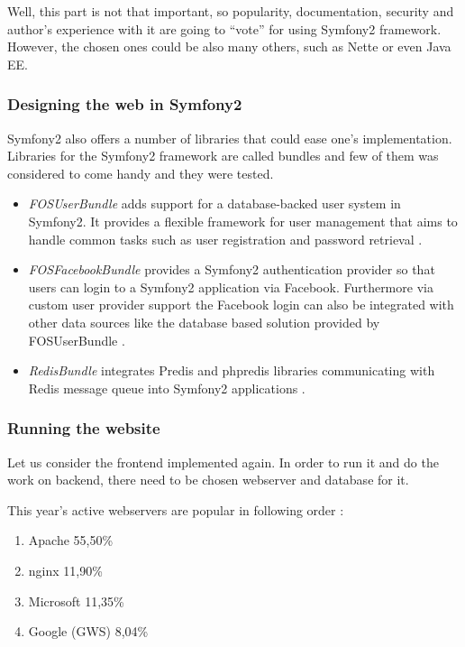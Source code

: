 \documentclass[thesis=B,english]{FITthesis}[2013/04/26]
\begin{document}
Well, this part is not that important, so popularity, documentation, security and author's experience with it are going to ``vote'' for using Symfony2 framework. However, the chosen ones could be also many others, such as Nette or even Java EE.

\subsubsection{Designing the web in Symfony2}

Symfony2 also offers a number of libraries that could ease one's implementation. Libraries for the Symfony2 framework are called bundles and few of them was considered to come handy and they were tested.

\begin{itemize}
	\item \emph{FOSUserBundle} adds support for a database-backed user system in Symfony2. It provides a flexible framework for user management that aims to handle common tasks such as user registration and password retrieval \cite{fosuserbundle}.
	\item \emph{FOSFacebookBundle} provides a Symfony2 authentication provider so that users can login to a Symfony2 application via Facebook. Furthermore via custom user provider support the Facebook login can also be integrated with other data sources like the database based solution provided by FOSUserBundle \cite{fosfacebookbundle}.
	\item \emph{RedisBundle} integrates Predis and phpredis libraries communicating with Redis message queue into Symfony2 applications \cite{redisbundle}.
\end{itemize}


\subsubsection{Running the website}

Let us consider the frontend implemented again. In order to run it and do the work on backend, there need to be chosen webserver and database for it.

This year's active webservers are popular in following order \cite{webserver_usage}:
\begin{enumerate}
	\item Apache 55,50\%
	\item nginx 11,90\%
	\item Microsoft 11,35\%
	\item Google (GWS) 8,04\%
\end{enumerate}
\end{document}
